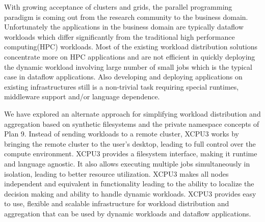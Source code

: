 
\begin{abstracts}        %

With growing acceptance of clusters and grids, the parallel programming
paradigm is coming out from the research community to the business domain.
Unfortunately the applications in the business domain are typically dataflow 
workloads which differ significantly from the traditional high
performance computing(HPC) workloads.  Most of the existing workload distribution
solutions concentrate more on HPC applications and are not efficient in quickly 
deploying the dynamic workload involving large number of small jobs which 
is the typical case in dataflow applications.
Also developing and deploying applications on existing infrastructures still 
is a non-trivial task requiring special runtimes, middleware support and/or language dependence.

We have explored an alternate approach for simplifying workload
distribution and aggregation based on synthetic filesystems and the private
namespace concepts of Plan 9.  Instead of sending workloads to a remote
cluster, XCPU3 works by bringing the remote cluster to the user's desktop,
leading to full control over the compute environment.   XCPU3 provides
a filesystem interface, making it runtime and language agnostic.  It also
allows executing multiple jobs simultaneously in isolation, leading to
better resource utilization.  XCPU3 makes all nodes independent and
equivalent in functionality leading to the ability to localize the
decision making and ability to handle dynamic workloads.  
XCPU3 provides easy to use, flexible and scalable infrastructure for 
workload distribution and aggregation that can be used by 
dynamic workloads and dataflow applications.

\end{abstracts}


